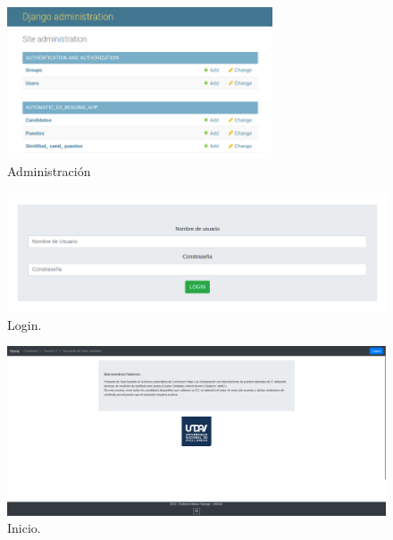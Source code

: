 \documentclass[12pt,a4paper]{article}
\begin{document}
\begin{sloppypar}
\begin{figure}[H]    %
 \centering
 \includegraphics[width=0.7\textwidth]{images/implementacion_web/impl_web_0.png}
 \caption{Administración} 
 \label{fig:impl_web_0}
\end{figure}

\begin{figure}[H]    %
 \centering
 \includegraphics[width=1\textwidth]{images/implementacion_web/impl_web_1.png}
 \caption{Login.} 
 \label{fig:impl_web_1}
\end{figure}

\begin{figure}[H]    %
 \centering
 \includegraphics[width=1\textwidth]{images/implementacion_web/impl_web_2.png}
 \caption{Inicio.} 
 \label{fig:impl_web_2}
\end{figure}


\end{sloppypar}
\end{document}
